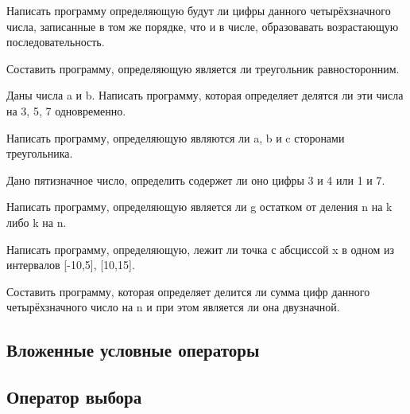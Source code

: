 \task Написать программу определяющую будут ли цифры данного четырёхзначного числа, записанные в том же порядке, что и в числе, образовавать возрастающую последовательность.

\task Составить программу, определяющую является ли треугольник равносторонним.

\task Даны числа a и b. Написать программу, которая определяет делятся ли эти числа на 3, 5, 7 одновременно.

\task Написать программу, определяющую являются ли a, b и c сторонами треугольника.

\task Дано пятизначное число, определить содержет ли оно цифры 3 и 4 или 1 и 7.

\task Написать программу, определяющую является ли g остатком от деления n на k либо k на n.

\task Написать программу, определяющую, лежит ли точка с абсциссой x в одном из интервалов [-10,5], [10,15].

\task Составить программу, которая определяет делится ли сумма цифр данного четырёхзначного число на n и при этом является ли она двузначной.

\subsection{Вложенные условные операторы}

\subsection{Оператор выбора}
